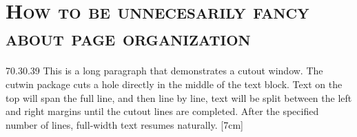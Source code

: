\documentclass{article}
\begin{document}
\renewcommand{\windowpagestuff}{%
    \centering
    \begin{tcolorbox}[colback=blue!10, colframe=black, width=4cm, height=3cm, valign=center]
        \large \centering \color{red}
        Something catchy goes here to catch your eye.
    \end{tcolorbox}%
}

\section*{\textsc{How to be unnecesarily fancy about page organization} }
\begin{minipage}[t]{0.65\textwidth}
\begin{cutout}{7}{0.3\textwidth}{0.3\textwidth}{9}
This is a long paragraph that demonstrates a cutout window. The cutwin package cuts a hole directly in the middle of the text block. Text on the top will span the full line, and then line by line, text will be split between the left and right margins until the cutout lines are completed. After the specified number of lines, full-width text resumes naturally. [7cm] \lipsum[3-5]
\end{cutout}
\end{minipage}%
\hfill%
\begin{minipage}[t]{0.25\textwidth}
    \vspace{15mm}
    \lipsum[1]
\end{minipage}
\end{document}
